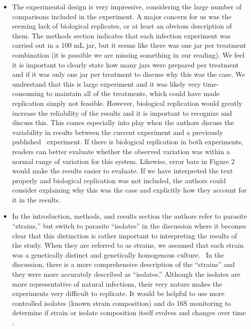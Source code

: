 \documentclass[10pt]{article}
\providecommand{\tightlist}{\setlength{\itemsep}{0pt}\setlength{\parskip}{0pt}}%
\begin{document}
\begin{itemize}
\tightlist
\item
  The experimental design is very impressive, considering the large
  number of comparisons included in the experiment. A major concern for
  us was the seeming lack of biological replicates, or at least an
  obvious description of them. The methods section indicates that each
  infection experiment was carried out in a 100 mL jar, but it seems
  like there was one jar per treatment combination (it is possible we
  are missing something in our reading). We feel it is important to
  clearly state how many jars were prepared per treatment and if it was
  only one jar per treatment to discuss why this was the case. We
  understand that this is large experiment and it was likely very
  time-consuming to maintain all of the treatments, which could have
  made replication simply not feasible. However, biological replication
  would greatly increase the reliability of the results and it is
  important to recognize and discuss this. This comes especially into
  play when the authors discuss the variability in results between the
  current experiment and a previously published~ experiment. If there is
  biological replication in both experiments, readers can better
  evaluate whether the observed variation was within a normal range of
  variation for this system. Likewise, error bars in Figure 2 would make
  the results easier to evaluate. If we have interpreted the text
  properly and biological replication was not included, the authors
  could consider explaining why this was the case and explicitly how
  they account for it in the results.
\item
  In the introduction, methods, and results section the authors refer to
  parasite ``strains,'' but switch to parasite ``isolates'' in the
  discussion where it becomes clear that this distinction is rather
  important to interpreting the results of the study. When they are
  referred to as strains, we assumed that each strain was a genetically
  distinct and genetically homogenous culture.~ In the discussion, there
  is a more comprehensive description of the ``strains'' and they were
  more accurately described as ``isolates.'' Although the isolates are
  more representative of natural infections, their very nature makes the
  experiments very difficult to replicate. It would be helpful to use
  more controlled isolates (known strain composition) and do 16S
  monitoring to determine if strain or isolate composition itself
  evolves and changes over time .
\end{itemize}
\end{document}
